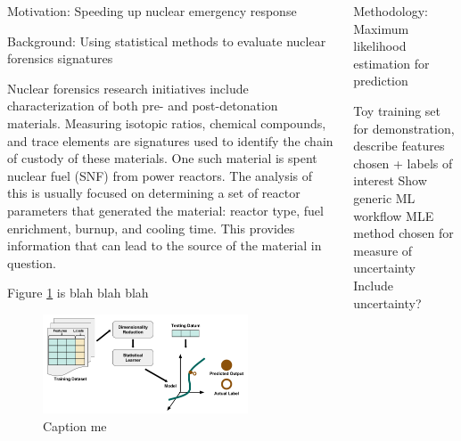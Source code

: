 \documentclass{beamer}
\begin{document}
\begin{frame}[t]{}
\begin{columns}
\begin{column}[T]{0.27\textwidth}
\begin{block}{Motivation: Speeding up nuclear emergency response}
\end{block}

\begin{block}{Background: Using statistical methods to evaluate nuclear forensics signatures}

Nuclear forensics research initiatives include characterization of both pre-
and post-detonation materials. Measuring isotopic ratios, chemical compounds,
and trace elements are signatures used to identify the chain of custody of
these materials. One such material is spent nuclear fuel (SNF) from power
reactors. The analysis of this is usually focused on determining a set of
reactor parameters that generated the material: reactor type, fuel enrichment,
burnup, and cooling time. This provides information that can lead to the source
of the material in question.

Figure \ref{fig:ml-intro} is blah blah blah

\begin{figure}
  \includegraphics[width=0.8\textwidth]{figures/SupervisedRegression.png}
  \caption{Caption me}
  \label{fig:ml-intro}
\end{figure}

\end{block}
\end{column}

\begin{column}[T]{0.72\textwidth}
\begin{columns}[t]
\begin{column}{0.32\textwidth}
\begin{block}{Methodology: Maximum likelihood estimation for prediction}

Toy training set for demonstration, describe features chosen + labels of interest
Show generic ML workflow
MLE method chosen for measure of uncertainty 
Include uncertainty? 


\end{block}
\end{column}
\end{columns}
\end{column}
\end{columns}
\end{frame}
\end{document}
